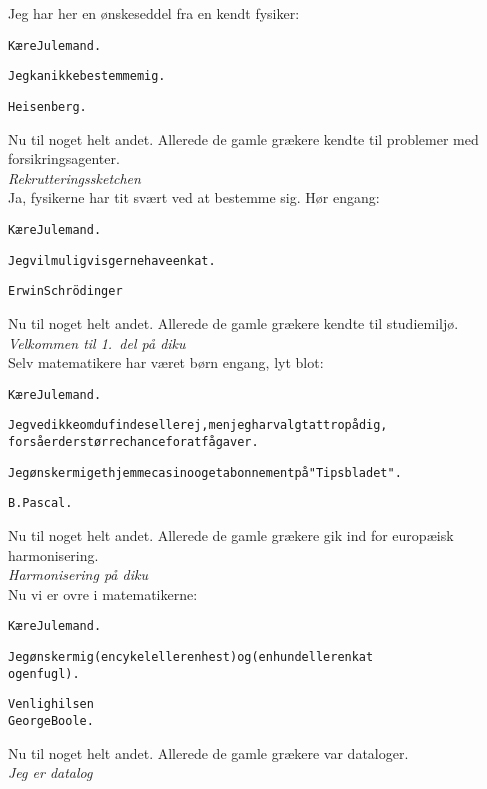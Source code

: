 \documentclass[a4paper,11pt]{article}
\begin{document}
\pagebreak

\noindent
Jeg har her en \o{}nskeseddel fra en kendt fysiker: \\
\begin{alltt}
{\rm
K\ae{}re Julemand.

Jeg kan ikke bestemme mig.

                                 Heisenberg.
}
\end{alltt}
Nu til noget helt andet. Allerede de gamle gr\ae{}kere kendte til problemer med
forsikringsagenter. \\
{\em Rekrutteringssketchen} \\
Ja, fysikerne har tit sv\ae{}rt ved at bestemme sig. H\o{}r engang: \\
\begin{alltt}
{\rm
K\ae{}re Julemand.

Jeg vil muligvis gerne have en kat.

                            Erwin Schr\"odinger
}
\end{alltt}
Nu til noget helt andet. Allerede de gamle gr\ae{}kere kendte til studiemilj\o{}. \\
{\em Velkommen til 1.\ del p\aa{} {\sc diku}} \\
Selv matematikere har v\ae{}ret b\o{}rn engang, lyt blot: \\
\begin{alltt}
{\rm
K\ae{}re Julemand.

Jeg ved ikke om du findes eller ej, men jeg har valgt at tro p\aa{} dig,
for s\aa{} er der st\o{}rre chance for at f\aa{} gaver.

Jeg \o{}nsker mig et hjemmecasino og et abonnement p\aa{} "Tipsbladet".

                                 B. Pascal.
}
\end{alltt}
Nu til noget helt andet. Allerede de gamle gr\ae{}kere gik ind for europ\ae{}isk harmonisering. \\
{\em Harmonisering p\aa{} {\sc diku}} \\
Nu vi er ovre i matematikerne:
\begin{alltt}
{\rm
K\ae{}re Julemand.

Jeg \o{}nsker mig (en cykel eller en hest) og (en hund eller en kat
og en fugl).

                            Venlig hilsen
                            George Boole.
}
\end{alltt}
Nu til noget helt andet. Allerede de gamle gr\ae{}kere var dataloger. \\
{\em Jeg er datalog} \\
\end{document}
